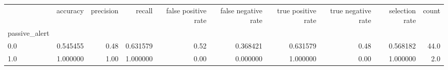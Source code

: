 \begin{tabular}{lrrrrrrrrr}
\toprule
{} &  accuracy &  precision &    recall &  false positive rate &  false negative rate &  true positive rate &  true negative rate &  selection rate &  count \\
passive\_alert &           &            &           &                      &                      &                     &                     &                 &        \\
\midrule
0.0           &  0.545455 &       0.48 &  0.631579 &                 0.52 &             0.368421 &            0.631579 &                0.48 &        0.568182 &   44.0 \\
1.0           &  1.000000 &       1.00 &  1.000000 &                 0.00 &             0.000000 &            1.000000 &                0.00 &        1.000000 &    2.0 \\
\bottomrule
\end{tabular}
